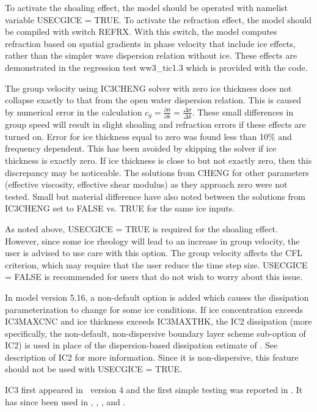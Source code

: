 To activate the shoaling effect, the model should be
operated with namelist variable {\code USECGICE = TRUE}. To activate the refraction effect, the model should be
compiled with switch {\code REFRX}. With this switch, the model computes
refraction based on spatial gradients in phase velocity that include ice effects, rather than the
simpler wave dispersion relation without ice. These effects are demonstrated in the regression test {\file
ww3\_tic1.3} which is provided with the code.

The group velocity using {\code IC3CHENG} solver with zero ice thickness does not collapse exactly to that from the open water dispersion relation. This is caused by numerical error in the calculation $c_g = \frac{\partial \sigma}{\partial k} = \frac{\Delta \sigma}{\Delta k} $. These small differences in group speed will result in slight shoaling and refraction errors if these effects are turned on. Error for ice thickness equal to zero was found less than 10\% and frequency dependent. This has been avoided by skipping the solver if ice thickness is exactly zero. If ice thickness is close to but not exactly zero, then this discrepancy may be noticeable. The solutions from CHENG for other parameters (effective viscosity, effective shear modulus) as they approach zero were not tested. Small but material difference have also noted between the solutions from {\code IC3CHENG} set to {\code FALSE} vs. {\code TRUE} for the same ice inputs.

As noted above, {\code USECGICE = TRUE} is required for the shoaling effect. However, since some ice rheology will lead to an increase in group velocity, the user is advised to use care with this option. The group velocity affects the CFL criterion, which may require that the user reduce the time step size. {\code USECGICE = FALSE} is recommended for users that do not wish to worry about this issue.

In model version 5.16, a non-default option is added which causes the dissipation parameterization to change for some ice conditions. If ice concentration exceeds {\code IC3MAXCNC} and ice thickness exceeds {\code IC3MAXTHK}, the {\code IC2} dissipation (more specifically, the non-default, non-dispersive boundary layer scheme sub-option of {\code IC2}) is used in place of the dispersion-based dissipation estimate of \cite{art:WS10}. See description of {\code IC2} for more information. Since it is non-dispersive, this feature should not be used with {\code USECGICE = TRUE}.

{\code IC3} first appeared in \ww\ version 4 and the first simple testing was reported in \cite{pro:RZ14}. It has since been used in \cite{art:LKS15}, \cite{art:WHR16}, \cite{art:RTS16}, and \cite{art:CRT17}.

